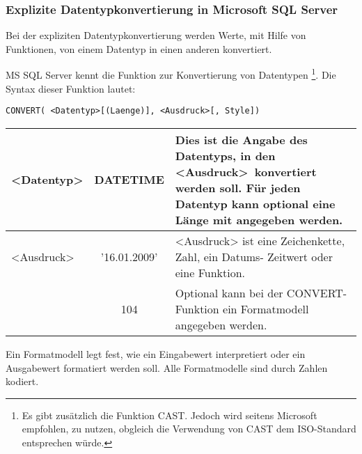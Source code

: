         \subsubsection{Explizite Datentypkonvertierung in Microsoft SQL Server}
          \begin{merke}
            Bei der expliziten Datentypkonvertierung werden Werte, mit Hilfe von Funktionen, von einem Datentyp in einen anderen konvertiert.
          \end{merke}
          MS SQL Server kennt die Funktion  zur Konvertierung von Datentypen \footnote{Es gibt zusätzlich die Funktion CAST. Jedoch wird seitens Microsoft empfohlen,  zu nutzen, obgleich die Verwendung von CAST dem ISO-Standard entsprechen würde.}. Die Syntax dieser Funktion lautet:
          \begin{lstlisting}[language=ms_sql,caption={Die Syntax der CONVERT-Funktion in MS SQL Server},label=sql03_31]
CONVERT( <Datentyp>[(Laenge)], <Ausdruck>[, Style])
          \end{lstlisting}
          \begin{center}
            \label{argconvert}
            \begin{small}
              \tabletail{
                \hline
              }
              \tablelasttail{
                \hline
              }
              \begin{supertabular}{|l|c|p{8.5cm}|}
                \textless Datentyp\textgreater & DATETIME & Dies ist die Angabe des Datentyps, in den \textless Ausdruck\textgreater\ konvertiert werden soll.  Für jeden Datentyp kann optional eine Länge mit angegeben werden.\\
                \hline
                \textless Ausdruck\textgreater & '16.01.2009'& <Ausdruck> ist eine Zeichenkette, Zahl, ein Datums- Zeitwert oder eine Funktion. \\
                \hline
                [Style] & 104 & Optional kann bei der CONVERT-Funktion ein Formatmodell angegeben werden. \\
              \end{supertabular}
            \end{small}
          \end{center}
          Ein Formatmodell legt fest, wie ein Eingabewert interpretiert oder ein Ausgabewert formatiert werden soll. Alle Formatmodelle sind durch Zahlen kodiert.

